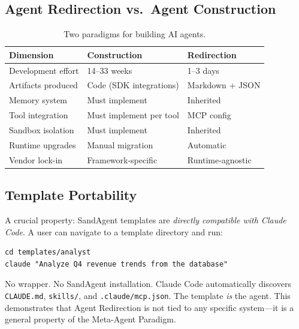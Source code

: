 \subsection{Agent Redirection vs.\ Agent Construction}

\begin{table}[h]
\caption{Two paradigms for building AI agents.}
\label{tab:paradigm-comparison}
\centering
\small
\begin{tabular}{@{}lll@{}}
\toprule
\textbf{Dimension} & \textbf{Construction} & \textbf{Redirection} \\
\midrule
Development effort & 14--33 weeks & 1--3 days \\
Artifacts produced & Code (SDK integrations) & Markdown + JSON \\
Memory system & Must implement & Inherited \\
Tool integration & Must implement per tool & MCP config \\
Sandbox isolation & Must implement & Inherited \\
Runtime upgrades & Manual migration & Automatic \\
Vendor lock-in & Framework-specific & Runtime-agnostic \\
\bottomrule
\end{tabular}
\end{table}

\subsection{Template Portability}

A crucial property: SandAgent templates are \textit{directly compatible with Claude Code}. A user can navigate to a template directory and run:

\begin{lstlisting}[style=templatefile]
cd templates/analyst
claude "Analyze Q4 revenue trends from the database"
\end{lstlisting}

No wrapper. No SandAgent installation. Claude Code automatically discovers \texttt{CLAUDE.md}, \texttt{skills/}, and \texttt{.claude/mcp.json}. The template \textit{is} the agent. This demonstrates that Agent Redirection is not tied to any specific system---it is a general property of the Meta-Agent Paradigm.
